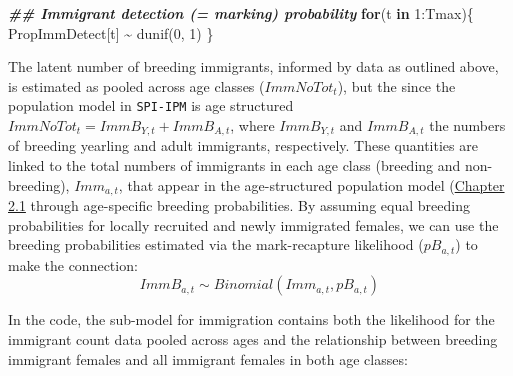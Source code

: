 \documentclass[
]{book}
\newenvironment{Shaded}{\begin{snugshade}}{\end{snugshade}}
\newcommand{\ControlFlowTok}[1]{\textcolor[rgb]{0.13,0.29,0.53}{\textbf{#1}}}
\newcommand{\DecValTok}[1]{\textcolor[rgb]{0.00,0.00,0.81}{#1}}
\newcommand{\DocumentationTok}[1]{\textcolor[rgb]{0.56,0.35,0.01}{\textbf{\textit{#1}}}}
\newcommand{\FunctionTok}[1]{\textcolor[rgb]{0.00,0.00,0.00}{#1}}
\newcommand{\NormalTok}[1]{#1}
\newcommand{\SpecialCharTok}[1]{\textcolor[rgb]{0.00,0.00,0.00}{#1}}
\begin{document}
\begin{Shaded}
\begin{Highlighting}[]
\DocumentationTok{\#\# Immigrant detection (= marking) probability}
\ControlFlowTok{for}\NormalTok{(t }\ControlFlowTok{in} \DecValTok{1}\SpecialCharTok{:}\NormalTok{Tmax)\{}
\NormalTok{  PropImmDetect[t] }\SpecialCharTok{\textasciitilde{}} \FunctionTok{dunif}\NormalTok{(}\DecValTok{0}\NormalTok{, }\DecValTok{1}\NormalTok{)}
\NormalTok{\}}
\end{Highlighting}
\end{Shaded}

The latent number of breeding immigrants, informed by data as outlined above, is estimated as pooled across age classes (\(ImmNoTot_t\)), but the since the population model in \texttt{SPI-IPM} is age structured \(ImmNoTot_t = ImmB_{Y,t} +ImmB_{A,t}\), where \(ImmB_{Y,t}\) and \(ImmB_{A,t}\) the numbers of breeding yearling and adult immigrants, respectively. These quantities are linked to the total numbers of immigrants in each age class (breeding and non-breeding), \(Imm_{a,t}\), that appear in the age-structured population model (\protect\hyperlink{ux5cux23ux5cux2520Openux5cux2520populationux5cux2520modelux5cux2520withux5cux25202ux5cux2520ageux5cux2520classes}{Chapter 2.1} through age-specific breeding probabilities.
By assuming equal breeding probabilities for locally recruited and newly immigrated females, we can use the breeding probabilities estimated via the mark-recapture likelihood (\(pB_{a,t}\)) to make the connection:
\begin{equation}
  ImmB_{a,t} \sim Binomial(Imm_{a,t}, pB_{a,t})
\end{equation}

In the code, the sub-model for immigration contains both the likelihood for the immigrant count data pooled across ages and the relationship between breeding immigrant females and all immigrant females in both age classes:
\end{document}
